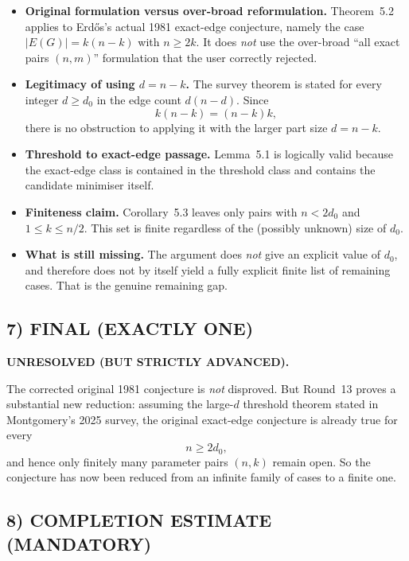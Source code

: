 \begin{itemize}
\item \textbf{Original formulation versus over-broad reformulation.}
Theorem~5.2 applies to Erd\H{o}s's actual 1981 exact-edge conjecture, namely the case $|E(G)|=k(n-k)$ with $n\ge 2k$. It does \emph{not} use the over-broad ``all exact pairs $(n,m)$'' formulation that the user correctly rejected.

\item \textbf{Legitimacy of using $d=n-k$.}
The survey theorem is stated for every integer $d\ge d_0$ in the edge count $d(n-d)$. Since
\[
k(n-k)=(n-k)k,
\]
there is no obstruction to applying it with the larger part size $d=n-k$.

\item \textbf{Threshold to exact-edge passage.}
Lemma~5.1 is logically valid because the exact-edge class is contained in the threshold class and contains the candidate minimiser itself.

\item \textbf{Finiteness claim.}
Corollary~5.3 leaves only pairs with $n<2d_0$ and $1\le k\le n/2$. This set is finite regardless of the (possibly unknown) size of $d_0$.

\item \textbf{What is still missing.}
The argument does \emph{not} give an explicit value of $d_0$, and therefore does not by itself yield a fully explicit finite list of remaining cases.
That is the genuine remaining gap.
\end{itemize}

\subsection*{7) FINAL (EXACTLY ONE)}

\textbf{UNRESOLVED (BUT STRICTLY ADVANCED).}

The corrected original 1981 conjecture is \emph{not} disproved.
But Round~13 proves a substantial new reduction:
assuming the large-$d$ threshold theorem stated in Montgomery's 2025 survey, the original exact-edge conjecture is already true for every
\[
n\ge 2d_0,
\]
and hence only finitely many parameter pairs $(n,k)$ remain open.
So the conjecture has now been reduced from an infinite family of cases to a finite one.

\subsection*{8) COMPLETION ESTIMATE (MANDATORY)}

